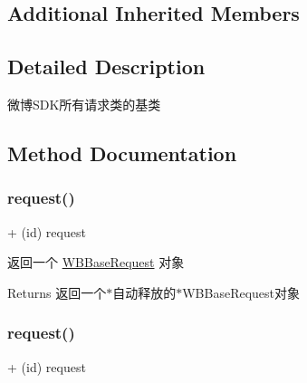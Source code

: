 \subsection*{Additional Inherited Members}


\subsection{Detailed Description}
微博\+S\+D\+K所有请求类的基类 

\subsection{Method Documentation}
\mbox{\label{interface_w_b_base_request_ab7489935d2d09eab8dbafff096c5432b}} 
\subsubsection{\texorpdfstring{request()}{request()}\hspace{0.1cm}{\footnotesize\ttfamily [1/3]}}
{\footnotesize\ttfamily + (id) request \begin{DoxyParamCaption}{ }\end{DoxyParamCaption}}

返回一个 \mbox{\hyperlink{interface_w_b_base_request}{W\+B\+Base\+Request}} 对象

\begin{DoxyReturn}{Returns}
返回一个$\ast$自动释放的$\ast$\+W\+B\+Base\+Request对象 
\end{DoxyReturn}
\mbox{\label{interface_w_b_base_request_ab7489935d2d09eab8dbafff096c5432b}} 
\subsubsection{\texorpdfstring{request()}{request()}\hspace{0.1cm}{\footnotesize\ttfamily [2/3]}}
{\footnotesize\ttfamily + (id) request \begin{DoxyParamCaption}{ }\end{DoxyParamCaption}}

